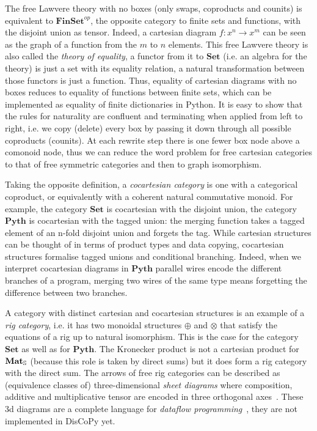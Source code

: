 The free Lawvere theory with no boxes (only swaps, coproducts and counits) is equivalent to $\mathbf{FinSet}^{op}$, the opposite category to finite sets and functions, with the disjoint union as tensor.
Indeed, a cartesian diagram $f : x^n \to x^m$ can be seen as the graph of a function from the $m$ to $n$ elements.
This free Lawvere theory is also called the \emph{theory of equality}, a functor from it to $\mathbf{Set}$ (i.e. an algebra for the theory) is just a set with its equality relation, a natural transformation between those functors is just a function.
Thus, equality of cartesian diagrams with no boxes reduces to equality of functions between finite sets, which can be implemented as equality of finite dictionaries in Python.
It is easy to show that the rules for naturality are confluent and terminating when applied from left to right, i.e. we copy (delete) every box by passing it down through all possible coproducts (counits).
At each rewrite step there is one fewer box node above a comonoid node, thus we can reduce the word problem for free cartesian categories to that of free symmetric categories and then to graph isomorphism.

Taking the opposite definition, a \emph{cocartesian category} is one with a categorical coproduct, or equivalently with a coherent natural commutative monoid.
For example, the category $\mathbf{Set}$ is cocartesian with the disjoint union, the category $\mathbf{Pyth}$ is cocartesian with the tagged union: the merging function takes a tagged element of an n-fold disjoint union and forgets the tag.
While cartesian structures can be thought of in terms of product types and data copying, cocartesian structures formalise tagged unions and conditional branching.
Indeed, when we interpret cocartesian diagrams in $\mathbf{Pyth}$ parallel wires encode the different branches of a program, merging two wires of the same type means forgetting the difference between two branches.

A category with distinct cartesian and cocartesian structures is an example of a \emph{rig category}, i.e. it has two monoidal structures $\oplus$ and $\otimes$ that satisfy the equations of a rig up to natural isomorphism.
This is the case for the category $\mathbf{Set}$ as well as for $\mathbf{Pyth}$.
The Kronecker product is not a cartesian product for $\mathbf{Mat}_\S$ (because this role is taken by direct sums) but it does form a rig category with the direct sum.
The arrows of free rig categories can be described as (equivalence classes of) three-dimensional \emph{sheet diagrams} where composition, additive and multiplicative tensor are encoded in three orthogonal axes~\cite{ComfortEtAl20}.
These 3d diagrams are a complete language for \emph{dataflow programming}~\cite{Delpeuch20a}, they are not implemented in DisCoPy yet.

